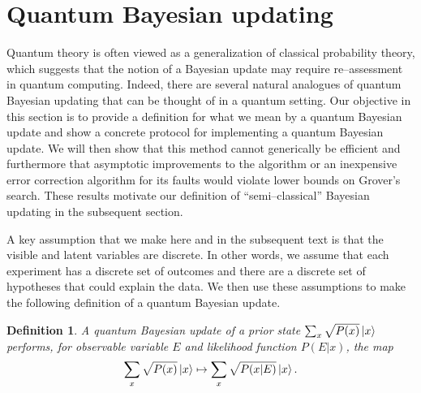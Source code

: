 \documentclass[aps,amsmath,onecolumn,amssymb]{revtex4}
\newtheorem{definition}{Definition}
\begin{document}


\section{Quantum Bayesian updating}
Quantum theory is often viewed as a generalization of classical probability theory, which suggests that the notion of a Bayesian update may require re--assessment in quantum computing.  Indeed, there are several natural analogues of quantum Bayesian updating that can be thought of in a quantum setting.
Our objective in this section is to provide a definition for what we mean by a quantum Bayesian update and show a concrete protocol for implementing a quantum Bayesian update.  We will then show that this method cannot generically be efficient and furthermore that asymptotic improvements to the algorithm or an inexpensive error correction algorithm for its faults would violate lower bounds on Grover's search.  These results motivate our definition of ``semi--classical'' Bayesian updating in the subsequent section.

 A key assumption that we make here and in the subsequent text is that the visible and latent variables are discrete.  In other words, we assume that each experiment has a discrete set of outcomes and there are a discrete set of hypotheses that could explain the data.  We then use these assumptions to make the following definition of a quantum Bayesian update.
\begin{definition}\label{def:qbayes}
A quantum Bayesian update of a prior state $\sum_x \sqrt{P(x)} \left|x\right\rangle$ performs, for observable variable $E$ and likelihood function $P(E|x)$, the map 
$$\sum_x \sqrt{P(x)} \left|x\right\rangle\mapsto  \sum_x \sqrt{P(x|E)} \left|x\right\rangle. $$
\end{definition}
\end{document}
